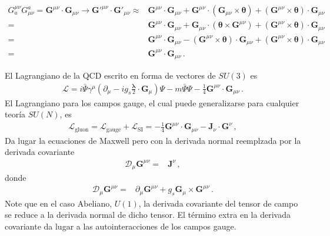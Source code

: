 \begin{align}
  G^{\mu\nu}_aG^a_{\mu\nu}=\mathbf{G}^{\mu\nu}\cdot\mathbf{G}_{\mu\nu}\to{\mathbf{G}'}^{\mu\nu}\cdot\mathbf{G}'_{\mu\nu}\approx&
  \mathbf{G}^{\mu\nu}\cdot\mathbf{G}_{\mu\nu}+\mathbf{G}^{\mu\nu}\cdot\left(\mathbf{G}_{\mu\nu}\times \boldsymbol{\theta}\right)
+\left(\mathbf{G}^{\mu\nu}\times \boldsymbol{\theta}\right)\cdot\mathbf{G}_{\mu\nu}\nonumber\\
=&\mathbf{G}^{\mu\nu}\cdot\mathbf{G}_{\mu\nu}+\mathbf{G}_{\mu\nu}\cdot\left(\boldsymbol{\theta}\times \mathbf{G}^{\mu\nu}\right)
+\left(\mathbf{G}^{\mu\nu}\times \boldsymbol{\theta}\right)\cdot\mathbf{G}_{\mu\nu}\nonumber\\
=& \mathbf{G}^{\mu\nu}\cdot\mathbf{G}_{\mu\nu}-\left(\mathbf{G}^{\mu\nu}\times \boldsymbol{\theta}\right)\cdot\mathbf{G}_{\mu\nu}
+\left(\mathbf{G}^{\mu\nu}\times \boldsymbol{\theta}\right)\cdot\mathbf{G}_{\mu\nu}\nonumber\\
=&\mathbf{G}^{\mu\nu}\cdot\mathbf{G}_{\mu\nu}\,.
\end{align}

El Lagrangiano de la QCD escrito en forma de vectores de $SU(3)$ es
\begin{align}
  \mathcal{L}=i\bar{\Psi}\gamma^\mu\left(\partial_\mu-i g_s\frac{\boldsymbol{\lambda}}{2}\cdot\mathbf{G}_\mu\right)\Psi
  -m\bar{\Psi}\Psi- \frac{1}{4}\mathbf{G}^{\mu\nu}\cdot\mathbf{G}_{\mu\nu}\,.
\end{align}
El Lagrangiano para los campos gauge, el cual puede generalizarse para cualquier teoría $SU(N)$, es
\begin{align}
  \mathcal{L}_{\text{gluon}}=\mathcal{L}_{\text{gauge}}+\mathcal{L}_{\text{SI}}=- \frac{1}{4}\mathbf{G}^{\mu\nu}\cdot\mathbf{G}_{\mu\nu}-\mathbf{J}_\nu\cdot\mathbf{G}^\nu\,,
\end{align}
Da lugar la ecuaciones de Maxwell pero con la derivada normal reemplzada por la derivada covariante 
\begin{align}
  \mathcal{D}_\mu \mathbf{G}^{\mu\nu}=&\mathbf{J}^\nu\,,
\end{align}
donde
\begin{align}
    \mathcal{D}_\mu \mathbf{G}^{\mu\nu}=&\partial_\mu\mathbf{G}^{\mu\nu}+g_s \mathbf{G}_\mu\times \mathbf{G}^{\mu\nu}\,.
\end{align}
Note que en el caso Abeliano, $U(1)$, la derivada covariante del tensor de campo se reduce a la derivada normal de dicho tensor. El término extra en la derivada covariante da lugar a las autointeracciones de los campos gauge.

